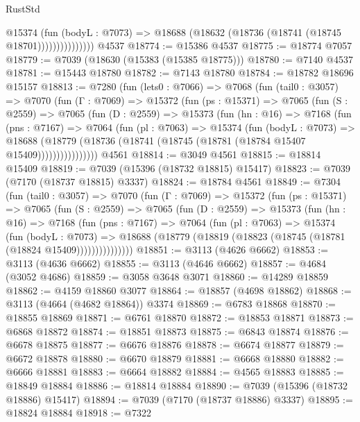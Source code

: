 \begin{lexlean}{RustStd}
\begin{coremodule}
                      @15374
                        (fun (bodyL : @7073) =>
                        @18688 (@18632 (@18736 (@18741 (@18745 @18701)))))))))))))))
    @4537
@18774 := @15386 @4537
@18775 := @18774 @7057
@18779 := @7039 (@18630 (@15383 (@15385 @18775)))
@18780 := @7140 @4537
@18781 := @15443 @18780
@18782 := @7143 @18780
@18784 := @18782 @18696 @15157
@18813 := @7280
    (fun (lets0 : @7066) =>
    @7068
      (fun (tail0 : @3057) =>
      @7070
        (fun (Γ : @7069) =>
        @15372
          (fun (ps : @15371) =>
          @7065
            (fun (S : @2559) =>
            @7065
              (fun (D : @2559) =>
              @15373
                (fun (hn : @16) =>
                @7168
                  (fun (pns : @7167) =>
                  @7064
                    (fun (pl : @7063) =>
                    @15374
                      (fun (bodyL : @7073) =>
                      @18688
                        (@18779
                          (@18736 (@18741 (@18745 (@18781 (@18784 @15407 @15409))))))))))))))))
    @4561
@18814 := @3049 @4561
@18815 := @18814 @15409
@18819 := @7039 (@15396 (@18732 @18815) @15417)
@18823 := @7039 (@7170 (@18737 @18815) @3337)
@18824 := @18784 @4561
@18849 := @7304
    (fun (tail0 : @3057) =>
    @7070
      (fun (Γ : @7069) =>
      @15372
        (fun (ps : @15371) =>
        @7065
          (fun (S : @2559) =>
          @7065
            (fun (D : @2559) =>
            @15373
              (fun (hn : @16) =>
              @7168
                (fun (pns : @7167) =>
                @7064
                  (fun (pl : @7063) =>
                  @15374
                    (fun (bodyL : @7073) =>
                    @18688 (@18779 (@18819 (@18823 (@18745 (@18781 (@18824 @15409)))))))))))))))
@18851 := @3113 (@4626 @6662)
@18853 := @3113 (@4636 @6662)
@18855 := @3113 (@4646 @6662)
@18857 := @4684 (@3052 @4686)
@18859 := @3058 @3648 @3071
@18860 := @14289 @18859
@18862 := @4159 @18860 @3077
@18864 := @18857 (@4698 @18862)
@18868 := @3113 (@4664 (@4682 @18864)) @3374
@18869 := @6783 @18868
@18870 := @18855 @18869
@18871 := @6761 @18870
@18872 := @18853 @18871
@18873 := @6868 @18872
@18874 := @18851 @18873
@18875 := @6843 @18874
@18876 := @6678 @18875
@18877 := @6676 @18876
@18878 := @6674 @18877
@18879 := @6672 @18878
@18880 := @6670 @18879
@18881 := @6668 @18880
@18882 := @6666 @18881
@18883 := @6664 @18882
@18884 := @4565 @18883
@18885 := @18849 @18884
@18886 := @18814 @18884
@18890 := @7039 (@15396 (@18732 @18886) @15417)
@18894 := @7039 (@7170 (@18737 @18886) @3337)
@18895 := @18824 @18884
@18918 := @7322

\end{coremodule}
\end{lexlean}
